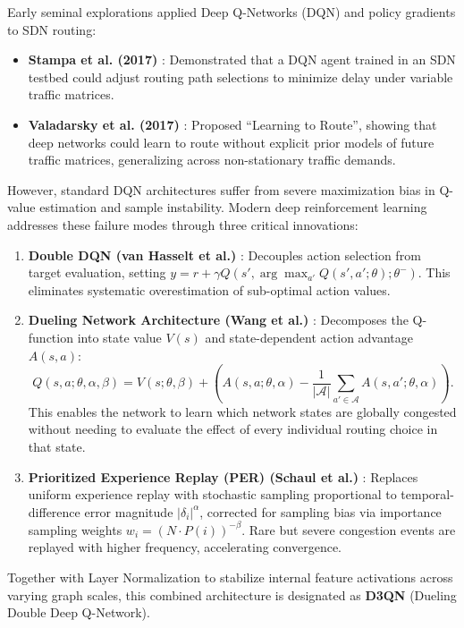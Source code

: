 \documentclass[12pt,a4paper,oneside]{report}
\begin{document}
Early seminal explorations applied Deep Q-Networks (DQN) \cite{mnih2015human} and policy gradients to SDN routing:
\begin{itemize}
  \item \textbf{Stampa et al. (2017)} \cite{stampa2017deep}: Demonstrated that a DQN agent trained in an SDN testbed could adjust routing path selections to minimize delay under variable traffic matrices.
  \item \textbf{Valadarsky et al. (2017)} \cite{valadarsky2017learning}: Proposed ``Learning to Route'', showing that deep networks could learn to route without explicit prior models of future traffic matrices, generalizing across non-stationary traffic demands.
\end{itemize}

However, standard DQN architectures suffer from severe maximization bias in Q-value estimation and sample instability. Modern deep reinforcement learning addresses these failure modes through three critical innovations:
\begin{enumerate}
  \item \textbf{Double DQN (van Hasselt et al.)} \cite{vanhasselt2016deep}: Decouples action selection from target evaluation, setting $y = r + \gamma Q(s', \arg\max_{a'} Q(s', a'; \theta); \theta^-)$. This eliminates systematic overestimation of sub-optimal action values.
  \item \textbf{Dueling Network Architecture (Wang et al.)} \cite{wang2016dueling}: Decomposes the Q-function into state value $V(s)$ and state-dependent action advantage $A(s, a)$:
  \begin{equation}
  Q(s, a; \theta, \alpha, \beta) = V(s; \theta, \beta) + \left( A(s, a; \theta, \alpha) - \frac{1}{|\mathcal{A}|} \sum_{a' \in \mathcal{A}} A(s, a'; \theta, \alpha) \right).
  \end{equation}
  This enables the network to learn which network states are globally congested without needing to evaluate the effect of every individual routing choice in that state.
  \item \textbf{Prioritized Experience Replay (PER) (Schaul et al.)} \cite{schaul2016prioritized}: Replaces uniform experience replay with stochastic sampling proportional to temporal-difference error magnitude $|\delta_i|^\alpha$, corrected for sampling bias via importance sampling weights $w_i = (N \cdot P(i))^{-\beta}$. Rare but severe congestion events are replayed with higher frequency, accelerating convergence.
\end{enumerate}
Together with Layer Normalization \cite{ba2016layer} to stabilize internal feature activations across varying graph scales, this combined architecture is designated as \textbf{D3QN} (Dueling Double Deep Q-Network).
\end{document}
